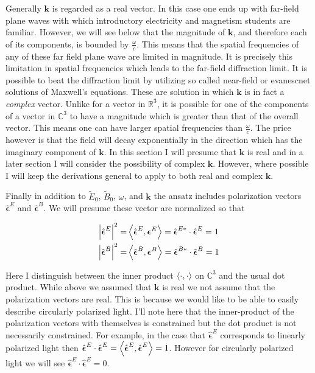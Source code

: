 \documentclass[12pt]{article}
\newcommand{\ep}{\epsilon}
\renewcommand{\vec}[1]{\boldsymbol{#1}}
\newcommand{\unitvec}[1]{\hat{\boldsymbol{#1}}}
\begin{document}
Generally $\vec{k}$ is regarded as a real vector.
In this case one ends up with far-field plane waves with which introductory electricity and magnetism students are familiar.
However, we will see below that the magnitude of $\vec{k}$, and therefore each of its components, is bounded by $\frac{\omega}{c}$.
This means that the spatial frequencies of any of these far field plane wave are limited in magnitude.
It is precisely this limitation in spatial frequencies which leads to the far-field diffraction limit.
It is possible to beat the diffraction limit by utilizing so called near-field or evanescnet solutions of Maxwell's equations.
These are solution in which $\vec{k}$ is in fact a \textit{complex} vector.
Unlike for a vector in $\mathbb{R}^3$, it is possible for one of the components of a vector in $\mathbb{C}^3$ to have a magnitude which is greater than that of the overall vector.
This means one can have larger spatial frequencies than $\frac{\omega}{c}$.
The price however is that the field will decay exponentially in the direction which has the imaginary component of $\vec{k}$.
In this section I will presume that $\vec{k}$ is real and in a later section I will consider the possibility of complex $\vec{k}$.
However, where possible I will keep the derivations general to apply to both real and complex $\vec{k}$.

Finally in addition to $\tilde{E}_0$, $\tilde{B}_0$, $\omega$, and $\vec{k}$ the ansatz includes polarization vectors $\unitvec{\ep}^E$ and $\unitvec{\ep}^B$. 
We will presume these vector are normalized so that

\begin{align}
\left|\unitvec{\ep}^E\right|^2 =& \Braket{\unitvec{\ep}^E, \vec{\ep}^E} = \unitvec{\ep}^{E*} \cdot \unitvec{\ep}^E = 1\\
\left|\unitvec{\ep}^B\right|^2 =& \Braket{\unitvec{\ep}^B, \vec{\ep}^B} = \unitvec{\ep}^{B*} \cdot \unitvec{\ep}^B = 1
\end{align}

Here I distinguish between the inner product $\Braket{\cdot, \cdot}$ on $\mathbb{C}^3$ and the usual dot product.
While above we assumed that $\vec{k}$ is real we not assume that the polarization vectors are real.
This is because we would like to be able to easily describe circularly polarized light.
I'll note here that the inner-product of the polarization vectors with themselves is constrained but the dot product is not necessarily constrained.
For example, in the case that $\unitvec{\ep}^E$ corresponds to linearly polarized light then $\unitvec{\ep}^E \cdot \unitvec{\ep}^E = \Braket{\unitvec{\ep}^E, \unitvec{\ep}^E} = 1$.
However for circularly polarized light we will see $\unitvec{\ep}^E \cdot \unitvec{\ep}^E = 0$.
\end{document}
